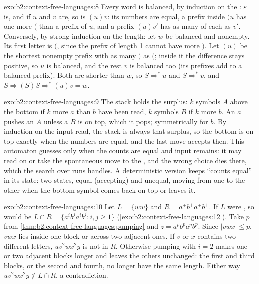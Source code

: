 \begin{solution}{exo:b2:context-free-languages:8}
Every  word is balanced, by induction on the : $\varepsilon$ is, and if $u$ and $v$ are, so is
$(u)v$: its numbers are equal, a prefix inside $(u$ has one more $($ than a prefix of $u$, and a prefix $(u)v'$ has as
many of each as $v'$. Conversely, by strong induction on the length: let $w$ be balanced and nonempty. Its first letter
is $($, since the prefix of length 1 cannot have more $)$. Let $(u)$ be the shortest nonempty prefix with as many $)$
as $($; inside it the difference stays positive, so $u$ is balanced, and the rest $v$ is balanced too (its prefixes
add to a balanced prefix). Both are shorter than $w$, so $S \Rightarrow^* u$ and $S \Rightarrow^* v$, and $S
\Rightarrow (S)S \Rightarrow^* (u)v = w$.
\end{solution}

\begin{solution}{exo:b2:context-free-languages:9}
The stack holds the surplus: $k$ symbols $A$ above the bottom if $k$ more $a$ than $b$ have been read, $k$ symbols $B$
if $k$ more $b$. An $a$ pushes an $A$ unless a $B$ is on top, which it pops; symmetrically for $b$. By induction on
the input read, the stack is always that surplus, so the bottom is on top exactly when the numbers are equal, and the
last move accepts then. This automaton guesses only when the counts are equal and input remains: it may read on or
take the spontaneous move to the , and the wrong choice dies there, which the search over runs
handles. A deterministic version keeps ``counts equal'' in its state: two states, equal (accepting) and unequal,
moving from one to the other when the bottom symbol comes back on top or leaves it.
\end{solution}

\begin{solution}{exo:b2:context-free-languages:10}
Let $L = \{ww\}$ and $R = a^+b^+a^+b^+$. If $L$ were , so would be $L \cap R = \{a^ib^ja^ib^j : i, j \ge
1\}$ (\cref{exo:b2:context-free-languages:12}). Take $p$ from \cref{thm:b2:context-free-languages:pumping} and $z =
a^pb^pa^pb^p$. Since $|vwx| \le p$, $vwx$ lies inside one block or across two adjacent ones. If $v$ or $x$ contains two
different letters, $uv^2wx^2y$ is not in $R$. Otherwise pumping with $i = 2$ makes one or two adjacent blocks longer
and leaves the others unchanged: the first and third blocks, or the second and fourth, no longer have the same length.
Either way $uv^2wx^2y \notin L \cap R$, a contradiction.
\end{solution}

